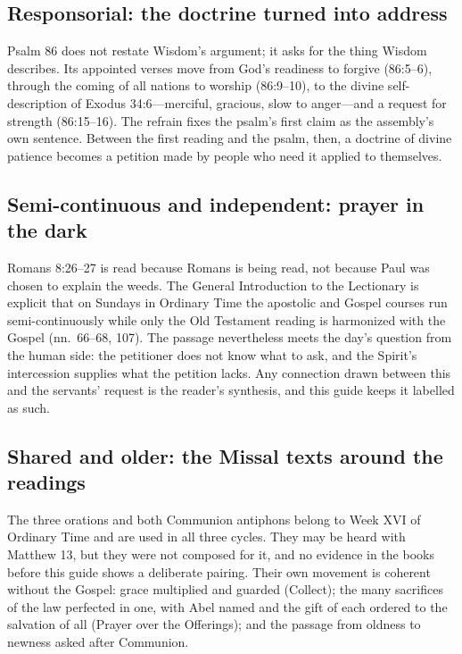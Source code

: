 \subsection*{Responsorial: the doctrine turned into address}

Psalm 86 does not restate Wisdom's argument; it asks for the thing Wisdom
describes. Its appointed verses move from God's readiness to forgive
(86:5--6), through the coming of all nations to worship (86:9--10), to the
divine self-description of Exodus 34:6---merciful, gracious, slow to
anger---and a request for strength (86:15--16). The refrain fixes the psalm's
first claim as the assembly's own sentence. Between the first reading and the
psalm, then, a doctrine of divine patience becomes a petition made by people
who need it applied to themselves.

\subsection*{Semi-continuous and independent: prayer in the dark}

Romans 8:26--27 is read because Romans is being read, not because Paul was
chosen to explain the weeds. The General Introduction to the Lectionary is
explicit that on Sundays in Ordinary Time the apostolic and Gospel courses run
semi-continuously while only the Old Testament reading is harmonized with the
Gospel (nn.\ 66--68, 107). The passage nevertheless meets the day's question
from the human side: the petitioner does not know what to ask, and the
Spirit's intercession supplies what the petition lacks. Any connection drawn
between this and the servants' request is the reader's synthesis, and this
guide keeps it labelled as such.

\subsection*{Shared and older: the Missal texts around the readings}

The three orations and both Communion antiphons belong to Week XVI of Ordinary
Time and are used in all three cycles. They may be heard with Matthew 13, but
they were not composed for it, and no evidence in the books before this guide
shows a deliberate pairing. Their own movement is coherent without the Gospel:
grace multiplied and guarded (Collect); the many sacrifices of the law
perfected in one, with Abel named and the gift of each ordered to the
salvation of all (Prayer over the Offerings); and the passage from oldness to
newness asked after Communion.

